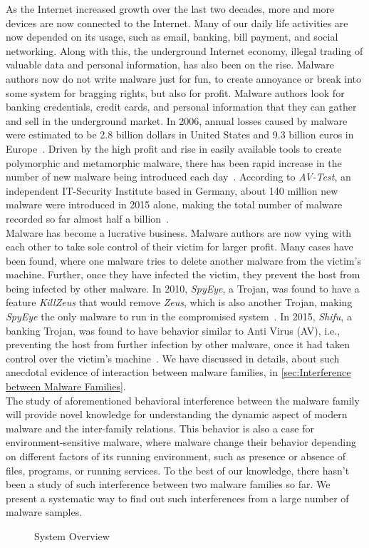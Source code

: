 As the Internet increased growth over the last two decades, more and more devices are now connected to the Internet.
Many of our daily life activities are now depended on its usage, such as email, banking, bill payment, and social networking.
Along with this, the underground Internet economy, illegal trading of valuable data and personal information, has also been on the rise.
Malware authors now do not write malware just for fun, to create annoyance or break into some system for bragging rights, but also for profit.
Malware authors look for banking credentials, credit cards, and personal information that they can gather and sell in the underground market.
In 2006, annual losses caused by malware were estimated to be 2.8 billion dollars in United States and 9.3 billion euros in Europe~\cite[]{moore2009economics}.
Driven by the high profit and rise in easily available tools to create polymorphic and metamorphic malware, there has been rapid increase in the number of new malware being introduced each day~\cite[]{tian}.
According to \emph{AV-Test}, an independent IT-Security Institute based in Germany, about 140 million new malware were introduced in 2015 alone, making the total number of malware recorded so far almost half a billion~\cite[]{avtest}.
\\

Malware has become a lucrative business.
Malware authors are now vying with each other to take sole control of their victim for larger profit.
Many cases have been found, where one malware tries to delete another malware from the victim's machine.
Further, once they have infected the victim, they prevent the host from being infected by other malware.
In 2010, \emph{SpyEye}, a Trojan, was found to have a feature \emph{KillZeus} that would remove \emph{Zeus}, which is also another Trojan, making \emph{SpyEye} the only malware to run in the compromised system~\cite[]{sanszeus}.
In 2015, \emph{Shifu}, a banking Trojan, was found to have behavior similar to Anti Virus (AV), i.e., preventing the host from further infection by other malware, once it had taken control over the victim's machine~\cite[]{secintelshifu}.
We have discussed in details, about such anecdotal evidence of interaction between malware families, in \autoref{sec:Interference between Malware Families}.\\

The study of aforementioned behavioral interference between the malware family will provide novel knowledge for understanding the dynamic aspect of modern malware and the inter-family relations.
This behavior is also a case for environment-sensitive malware, where malware change their behavior depending on different factors of its running environment, such as presence or absence of files, programs, or running services.
To the best of our knowledge, there hasn't been a study of such interference between two malware families so far.
We present a systematic way to find out such interferences from a large number of malware samples.
\begin{figure}[h]
    \centering
    \def\svgwidth{\columnwidth}
    \scalebox{0.7}{}
\caption{System Overview}
\label{fig:overview}
\end{figure}

